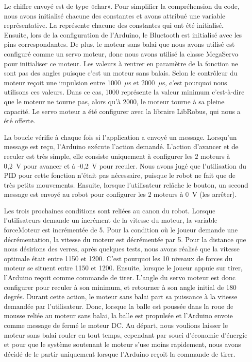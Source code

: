 
Le chiffre envoyé est de type «char».
Pour simplifier la compréhension du code, nous avons initialisé chacune des constantes et avons attribué une variable représentative.
La  représente chacune des constantes qui ont été initialisé.
Ensuite, lors de la configuration de l'Arduino, le Bluetooth est initialisé avec les pins correspondantes.
De plus, le moteur sans balai que nous avons utilisé est configuré comme un servo moteur, donc nous avons utilisé la classe MegaServo pour initialiser ce moteur.
Les valeurs à rentrer en paramètre de la fonction ne sont pas des angles puisque c’est un moteur sans balais.
Selon \cite{arduino_arduino_nodate} le contrôleur du moteur reçoit une impulsion entre 1000~$\mu$s et 2000~$\mu$s, c’est pourquoi nous utilisons ces valeurs.
Dans ce cas, 1000 représente la valeur minimum c’est-à-dire que le moteur ne tourne pas, alors qu’à 2000, le moteur tourne à sa pleine capacité.
Le servo moteur a été configurer avec la libraire LibRobus, qui nous a été offerte.

La boucle vérifie à chaque fois si l’application a envoyé un message.
Lorsqu’un message est reçu, l’Arduino exécute l’action demandé.
L’action d’avancer et de reculer est très simple, elle consiste uniquement à configurer les 2 moteurs à 0,2~V pour avancer et à -0,2~V pour reculer.
Nous avons jugé que l’utilisation du PID pour cette fonction n’était pas nécessaire, puisque le robot ne fait que de très petits mouvements.
Ensuite, lorsque l’utilisateur relâche le bouton, un second message est envoyé au robot pour configurer les 2 moteurs à 0~V (les arrêter).

Les trois prochaines conditions sont reliées au canon du robot.
Lorsque l’utilisateurs demande un incrément de la vitesse du moteur, la variable forceMoteur est incrémentée de 5.
Pour la condition où le joueur demande une décrémentation, la vitesse du moteur est décrémentée par 5.
Pour la distance que nous désirions des verres, après quelques tests, nous avons réalisé que la vitesse optimale était entre 1150 et 1200.
C’est pourquoi les 10 niveaux de forces du moteur se situent entre 1150 et 1200.
Ensuite, lorsque le joueur appuie sur tirer, l’Arduino reçoit comme commande de tirer.
L’angle du servo moteur est donc configurer pour reculer à son minimum, et retourner à son angle initial de 180 degrés.
Durant cette action, le moteur sans balai part sa puissance à la vitesse demandée par l’utilisateur.
Donc, lorsque la balle est poussée dans la roue de mousse reliée au moteur sans balai, la balle est propulsée et l’Arduino envoie comme message de fermé le moteur DC.
Au départ, nous voulions laisser le moteur sans balai rouler en tout temps, cependant par souci d’économie d’énergie et pour que le système soutenant le moteur s’use moins rapidement, nous avons décidé de le partir uniquement lorsque l’Arduino reçoit la commande de tirer.

